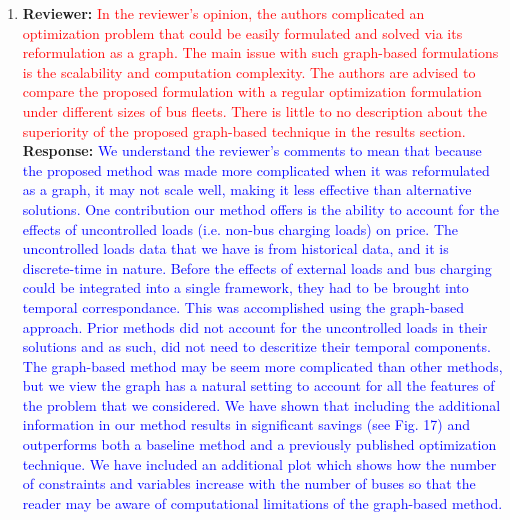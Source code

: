 \documentclass{article}
\newcommand\formatfeedback[2]
{%
	\textbf{Reviewer:} \textcolor{red}{#1} 
	\leavevmode\\[0.1in] \textbf{Response:} \textcolor{blue}{#2}
}
\begin{document}
\begin{enumerate}
	\item \formatfeedback{In the reviewer's opinion, the authors complicated an optimization problem that could be easily formulated and solved via its reformulation as a graph. The main issue with such graph-based formulations is the scalability and computation complexity. The authors are advised to compare the proposed formulation with a regular optimization formulation under different sizes of bus fleets. There is little to no description about the superiority of the proposed graph-based technique in the results section.}{We understand the reviewer's comments to mean that because the proposed method was made more complicated when it was reformulated as a graph, it may not scale well, making it less effective than alternative solutions. One contribution our method offers is the ability to account for the effects of uncontrolled loads (i.e. non-bus charging loads) on price. The uncontrolled loads data that we have is from historical data, and it is discrete-time in nature. Before the effects of external loads and bus charging could be integrated into a single framework, they had to be brought into temporal correspondance. This was accomplished using the graph-based approach. Prior methods did not account for the uncontrolled loads in their solutions and as such, did not need to descritize their temporal components. The graph-based method may be seem more complicated than other methods, but we view the graph has a natural setting to account for all the features of the problem that we considered. We have shown that including the additional information in our method results in significant savings (see Fig. 17) and outperforms both a baseline method and a previously published optimization technique. We have included an additional plot which shows how the number of constraints and variables increase with the number of buses so that the reader may be aware of computational limitations of the graph-based method.}
\end{enumerate}
\end{document}
